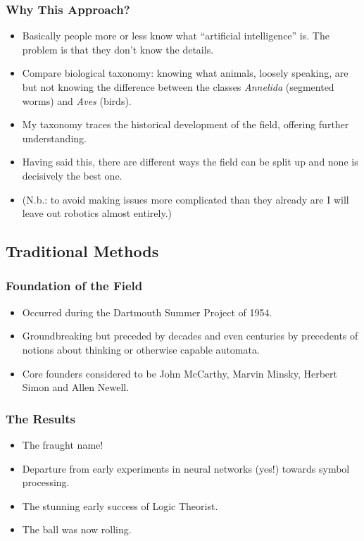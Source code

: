 \documentclass{beamer}
\begin{document}
  \begin{frame}
    \frametitle{Why This Approach?}

    \begin{itemize}
      \item Basically people more or less know what ``artificial
        intelligence'' is. The problem is that they don't know the details.
      \pause
      \item Compare biological taxonomy: knowing what animals, loosely
        speaking, are but not knowing the difference between the classes
        \textit{Annelida} (segmented worms) and \textit{Aves} (birds).
      \pause
      \item My taxonomy traces the historical development of the field, offering
        further understanding.
      \pause
      \item Having said this, there are different ways the field can be split
        up and none is decisively the best one.
      \pause
      \item (N.b.: to avoid making issues more complicated than they already
        are I will leave out robotics almost entirely.)
    \end{itemize}
  \end{frame}

  \subsection{Traditional Methods}

  \begin{frame}
    \frametitle{Foundation of the Field}
    \begin{itemize}
      \item Occurred during the Dartmouth Summer Project of 1954.
      \pause
      \item Groundbreaking but preceded by decades and even centuries by
        precedents of notions about thinking or otherwise capable automata.
      \pause
      \item Core founders considered to be John McCarthy, Marvin Minsky,
        Herbert Simon and Allen Newell.
    \end{itemize}
  \end{frame}

  \begin{frame}
    \frametitle{The Results}
    \begin{itemize}
      \item The fraught name!
      \pause
      \item Departure from early experiments in neural networks (yes!) towards
        symbol processing.
      \pause
      \item The stunning early success of Logic Theorist.
      \pause
      \item The ball was now rolling.
    \end{itemize}
  \end{frame}
\end{document}
